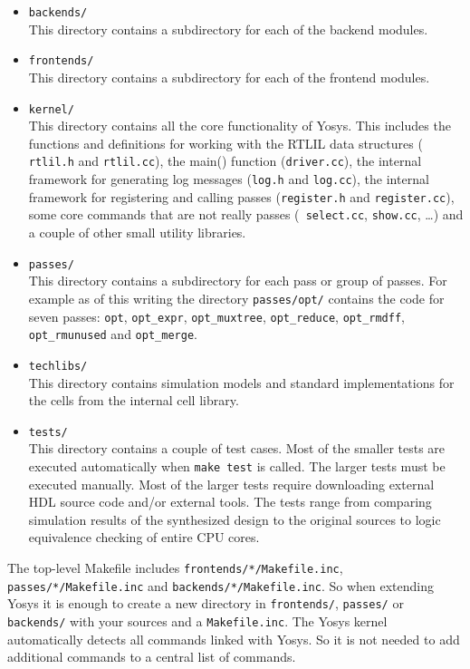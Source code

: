 \begin{itemize}

\item {\tt backends/} \\
This directory contains a subdirectory for each of the backend modules.

\item {\tt frontends/} \\
This directory contains a subdirectory for each of the frontend modules.

\item {\tt kernel/} \\
This directory contains all the core functionality of Yosys. This includes the
functions and definitions for working with the RTLIL data structures ({\tt
rtlil.h} and {\tt rtlil.cc}), the main() function ({\tt driver.cc}), the
internal framework for generating log messages ({\tt log.h} and {\tt log.cc}),
the internal framework for registering and calling passes ({\tt register.h} and
{\tt register.cc}), some core commands that are not really passes ({\tt
select.cc}, {\tt show.cc}, \dots) and a couple of other small utility libraries.

\item {\tt passes/} \\
This directory contains a subdirectory for each pass or group of passes. For example as
of this writing the directory {\tt passes/opt/} contains the code for seven
passes: {\tt opt}, {\tt opt\_expr}, {\tt opt\_muxtree}, {\tt opt\_reduce},
{\tt opt\_rmdff}, {\tt opt\_rmunused} and {\tt opt\_merge}.

\item {\tt techlibs/} \\
This directory contains simulation models and standard implementations for the
cells from the internal cell library.

\item {\tt tests/} \\
This directory contains a couple of test cases. Most of the smaller tests are executed
automatically when {\tt make test} is called. The larger tests must be executed
manually. Most of the larger tests require downloading external HDL source code
and/or external tools. The tests range from comparing simulation results of the synthesized
design to the original sources to logic equivalence checking of entire CPU cores.

\end{itemize}

\begin{sloppypar}
The top-level Makefile includes {\tt frontends/*/Makefile.inc}, {\tt passes/*/Makefile.inc}
and {\tt backends/*/Makefile.inc}. So when extending Yosys it is enough to create
a new directory in {\tt frontends/}, {\tt passes/} or {\tt backends/} with your sources
and a {\tt Makefile.inc}. The Yosys kernel automatically detects all commands linked with
Yosys. So it is not needed to add additional commands to a central list of commands.
\end{sloppypar}

